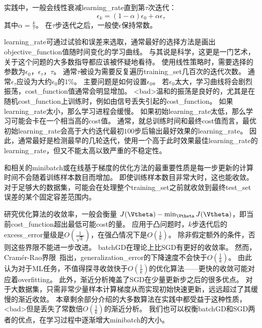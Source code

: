 实践中，一般会线性衰减\gls{learning_rate}直到第$\tau$次迭代：
\begin{equation}
\label{eq:8.14}
    \epsilon_k = (1-\alpha) \epsilon_0 + \alpha \epsilon_\tau
\end{equation}
其中$\alpha = \frac{k}{\tau}$。
在$\tau$步迭代之后，一般使$\epsilon$保持常数。


\gls{learning_rate}可通过试验和误差来选取，通常最好的选择方法是画出\gls{objective_function}值随时间变化的学习曲线。
与其说是科学，这更是一门艺术，关于这个问题的大多数指导都应该被怀疑地看待。
使用线性策略时，需要选择的参数为$\epsilon_0$，$\epsilon_\tau$，$\tau$。  
通常$\tau$被设为需要反复遍历\gls{training_set}几百次的迭代次数。
通常$\epsilon_\tau$应设为大约$\epsilon_0$的$1\%$。
主要问题是如何设置$\epsilon_0$。
若$\epsilon_0$太大，学习曲线将会剧烈振荡，\gls{cost_function}值通常会明显增加。
<bad>温和的振荡是良好的，尤其是在随机\gls{cost_function}上训练时，例如由信号丢失引起的\gls{cost_function}。
如果\gls{learning_rate}太小，那么学习进程会缓慢。
如果初始\gls{learning_rate}太低，那么学习可能会卡在一个相当高的\gls{cost}值。
通常，就总训练时间和最终\gls{cost}值而言，最优初始\gls{learning_rate}会高于大约迭代最初$100$步后输出最好效果的\gls{learning_rate}。
因此，通常最好是检测最早的几轮迭代，使用一个高于此时效果最佳\gls{learning_rate}的\gls{learning_rate}，但又不能太高以致严重的不稳定性。  


和相关的\gls{minibatch}或在线基于梯度的优化方法的最重要性质是每一步更新的计算时间不会随着训练样本数目而增加。
即使训练样本数目非常大时，这也能收敛。
对于足够大的数据集，可能会在处理整个\gls{training_set}之前就收敛到最终\gls{test_set}误差的某个固定容差范围内。

研究优化算法的收敛率，一般会衡量 $J(\Vtheta) - \min_{\Vtheta} J(\Vtheta)$，即当前\gls{cost_function}超出最低可能\gls{cost}的量。
应用于凸问题时，$k$步迭代后的\gls{excess_error}量级是$O(\frac{1}{\sqrt{k}})$，在强凸情况下是$O(\frac{1}{k})$。
除非假定额外的条件，否则这些界限不能进一步改进。
\gls{batch}\gls{GD}在理论上比\gls{SGD}有更好的收敛率。
然而，Cram\'er-Rao界限~\citep{Cramer-1946,Rao-1945}指出，\gls{generalization_error}的下降速度不会快于$O(\frac{1}{k})$。
\cite{bottou-bousquet-2008-small}由此认为对于\gls{ML}任务，不值得探寻收敛快于$O(\frac{1}{k})$的优化算法——更快的收敛可能对应着\gls{overfitting}。
此外，渐近分析掩盖了\gls{SGD}在少量更新步之后的很多优点。
对于大数据集，只需非常少量样本计算梯度从而实现初始快速更新，远远超过了其缓慢的渐近收敛。
本章剩余部分介绍的大多数算法在实践中都受益于这种性质，<bad>但是丢失了常数倍$O(\frac{1}{k})$的渐近分析。
我们也可以权衡\gls{batch}\gls{GD}和\gls{SGD}两者的优点，在学习过程中逐渐增大\gls{minibatch}的大小。


